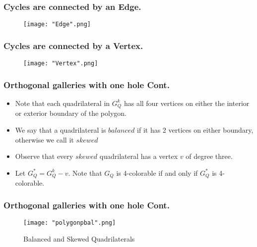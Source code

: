 \documentclass{beamer}
\begin{document}
\begin{frame}
\frametitle{Cycles are connected by an Edge.}
	\begin{center}
	\begin{figure}[H]
	\caption{}
	\centering
	\texttt{[image: "Edge".png]}
	\end{figure}
	\end{center}
\end{frame}




\begin{frame}
\frametitle{Cycles are connected by a Vertex.}
	\begin{center}
	\begin{figure}[H]
	\caption{}
	\centering
	\texttt{[image: "Vertex".png]}
	\end{figure}
	\end{center}
\end{frame}

















\begin{frame}
\frametitle{Orthogonal galleries with one hole Cont.}
\begin{itemize}
	\item Note that each quadrilateral in $G^{k}_Q$ has all four vertices on either the interior or exterior boundary of the polygon. 
	\vfill
	\item We say that a quadrilateral is $balanced$ if it has 2 vertices on either boundary, otherwise we call it $skewed$
	\vfill
	\item Observe that every $skewed$ quadrilateral has a vertex $v$ of degree three.
	\vfill
	\item Let $G^{*}_Q = G^{k}_Q - v$. Note that $G_{Q}$ is 4-colorable if and only if $G^{*}_Q$ is 4-colorable.
	\vfill
\end{itemize}
\end{frame}

\begin{frame}
\frametitle{Orthogonal galleries with one hole Cont.}
	\begin{center}
	\begin{figure}[H]
	\caption{Balanced and Skewed Quadrilaterals}
	\centering
	\texttt{[image: "polygonpbal".png]}
	\end{figure}
	\end{center}
\end{frame}
\end{document}
